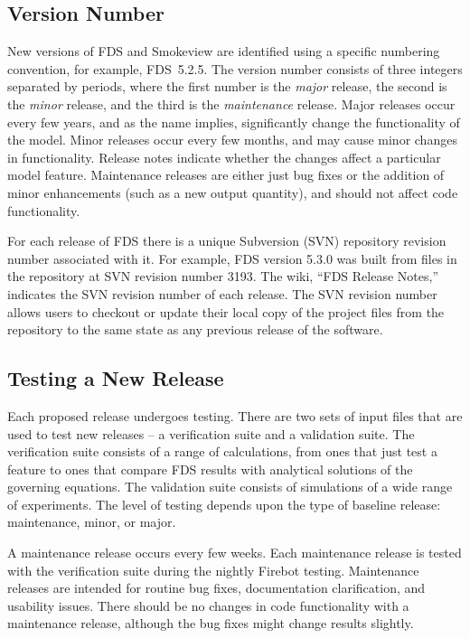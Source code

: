 \documentclass[11pt]{book}
\begin{document}
\subsection{Version Number}

New versions of FDS and Smokeview are identified using a specific numbering convention, for example, FDS~5.2.5. The version number consists of three integers separated by periods, where the first number is the {\em major} release, the second is the {\em minor} release, and the third is the {\em maintenance} release.  Major releases occur every few years, and as the name implies, significantly change the functionality of the model. Minor releases occur every few months, and may cause minor changes in functionality. Release notes indicate whether the changes affect a particular model feature. Maintenance releases are either just bug fixes or the addition of minor enhancements (such as a new output quantity), and should not affect code functionality.

For each release of FDS there is a unique Subversion (SVN) repository revision number associated with it. For example, FDS version 5.3.0 was built from files in the repository at SVN revision number 3193. The wiki, ``FDS Release Notes,'' indicates the SVN revision number of each release. The SVN revision number allows users to checkout or update their local copy of the project files from the repository to the same state as any previous release of the software.

\subsection{Testing a New Release}

Each proposed release undergoes testing. There are two sets of input files that are used to test new releases -- a verification suite and a validation suite. The verification suite consists of a range of calculations, from ones that just test a feature to ones that compare FDS results with analytical solutions of the governing equations. The validation suite consists of simulations of a wide range of experiments. The level of testing depends upon the type of baseline release: maintenance, minor, or major.

A maintenance release occurs every few weeks. Each maintenance release is tested with the verification suite during the nightly Firebot testing. Maintenance releases are intended for routine bug fixes, documentation clarification, and usability issues. There should be no changes in code functionality with a maintenance release, although the bug fixes might change results slightly.
\end{document}
